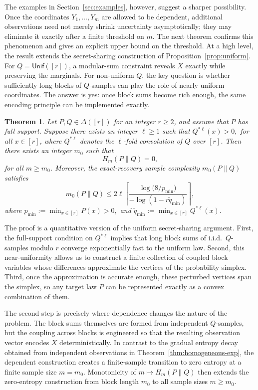\documentclass[journal]{IEEEtran}
\newtheorem{theorem}{Theorem}
\newcommand{\1}{\mathbf{1}}
\newcommand{\Unif}{\mathsf{Unif}}
\begin{document}
The examples in Section~\ref{sec:examples}, however, suggest a sharper
possibility. Once the coordinates $Y_1,\ldots,Y_m$ are allowed to be
dependent, additional observations need not merely shrink uncertainty
asymptotically; they may eliminate it exactly after a finite threshold on $m$. The
next theorem confirms this phenomenon and gives an explicit upper bound on
the threshold.
At a high level, the result extends the secret-sharing construction of
Proposition~\ref{prop:uniform}. For $Q=\Unif([r])$, a modular-sum constraint reveals $X$ exactly while preserving the marginals. For non-uniform $Q$, the key question is whether sufficiently long blocks of $Q$-samples can play the role of nearly uniform coordinates. The answer is yes: once block sums become rich enough, the same encoding principle can be implemented exactly.
\begin{theorem}\label{thm:equalZero}
Let $P,Q\in \Delta([r])$ for an integer $r\ge2$, and assume that $P$ has full
support. Suppose there exists an integer $\ell\ge1$ such that
\(Q^{*\ell}(x)>0,\) for all $x\in[r]$, where $Q^{*\ell}$ denotes the $\ell$-fold convolution of $Q$ over $[r]$. Then there exists an integer $m_0$ such that
$$H_m(P\|Q)=0,$$
for all $m\ge m_0$. Moreover, the exact-recovery sample complexity $m_0(P\|Q)$ satisfies 
\begin{equation}\label{eq:m^*_0}
m_0(P\|Q)
\le
2\ell
\left\lceil
\frac{\log\!\bigl(8/p_{\min}\bigr)}
{-\log(1-r\widetilde q_{\min})}
\right\rceil,
\end{equation}
where
\(p_{\min}:=\min_{x\in[r]}P(x)>0,\) and $\widetilde q_{\min}:=\min_{x\in[r]}Q^{*\ell}(x).$
\end{theorem}
The proof is a quantitative version of the uniform secret-sharing argument.
First, the full-support condition on $Q^{*\ell}$ implies that long block sums
of i.i.d.\ $Q$-samples modulo $r$ converge exponentially fast to the uniform
law. Second, this near-uniformity allows us to construct a finite collection
of coupled block variables whose differences approximate the
vertices of the probability simplex. Third, once the approximation is accurate
enough, these perturbed vertices span the simplex, so any target law
$P$ can be represented exactly as a convex combination of them.


The second step is precisely where dependence changes the nature of the problem. The
block sums themselves are formed from independent $Q$-samples, but the coupling
across blocks is engineered so that the resulting observation vector encodes
$X$ deterministically. In contrast to the gradual entropy decay obtained from
independent observations in Theorem~\ref{thm:homogeneous-exp}, the dependent
construction creates a finite-sample transition to zero entropy at a finite sample size $m=m_0$. Monotonicity of $m\mapsto H_m(P\|Q)$ then extends the zero-entropy construction from block length $m_0$ to all sample sizes $m\geq m_0$.
\end{document}

